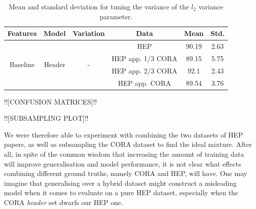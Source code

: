 \begin{table}[h]
\begin{center}
\begin{tabular}{|c|c|c|c|c|c|}
\hline
Features & Model & Variation & Data & Mean & Std.\\
\hline
\multirow{4}{*}{Baseline} & \multirow{4}{*}{Header} & \multirow{4}{*}{-} & HEP & 90.19 & 2.63\\\cline{4-6}
& & & HEP app. 1/3 CORA & 89.15 & 5.75\\\cline{4-6}
& & & HEP app. 2/3 CORA & 92.1 & 2.43\\\cline{4-6}
& & & HEP app. CORA & 89.54 & 3.76\\\cline{4-6}
\hline
\end{tabular}
\caption[Mean and standard deviation for tuning the variance of the $l_2$ variance parameter.]{Mean and standard deviation for tuning the variance of the $l_2$ variance parameter.}
\label{table:baselineresults}
\end{center}
\end{table}

!![CONFUSION MATRICES]!!

!![SUBSAMPLING PLOT]!!

We were therefore able to experiment with combining the two datasets of HEP papers, as well as subsampling the CORA dataset to find the ideal mixture. After all, in spite of the common wisdom that increasing the amount of training data will improve generalisation and model performance, it is not clear what effects combining different ground truths, namely CORA and HEP, will have. One may imagine that generalising over a hybrid dataset might construct a misleading model when it comes to evaluate on a pure HEP dataset, especially when the CORA \emph{header} set dwarfs our HEP one.


